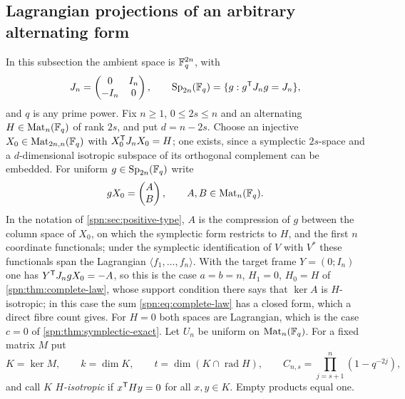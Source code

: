 
\subsection{Lagrangian projections of an arbitrary alternating form}\label{spn:sec:lagrangian}

In this subsection the ambient space is $\mathbb{F}_q^{2n}$, with
\[
 J_n=\begin{pmatrix}0&I_n\\-I_n&0\end{pmatrix},\qquad
 \operatorname{Sp}_{2n}(\mathbb{F}_q)=\{g:g^{\mathsf{T}}J_ng=J_n\},
\]
and $q$ is any prime power. Fix $n\ge1$,
$0\le2s\le n$ and an alternating $H\in\operatorname{Mat}_n(\mathbb{F}_q)$ of rank $2s$, and put $d=n-2s$. Choose
an injective $X_0\in\operatorname{Mat}_{2n,n}(\mathbb{F}_q)$ with $X_0^{\mathsf{T}}J_nX_0=H$; one exists, since a
symplectic $2s$-space and a $d$-dimensional isotropic subspace of its orthogonal complement
can be embedded. For uniform $g\in\operatorname{Sp}_{2n}(\mathbb{F}_q)$ write
\begin{equation}\label{spn:eq:lagrangian-model}
 gX_0=\begin{pmatrix}A\\B\end{pmatrix},\qquad A,B\in\operatorname{Mat}_n(\mathbb{F}_q).
\end{equation}
In the notation of \cref{spn:sec:positive-type}, $A$ is the compression of $g$ between the
column space of $X_0$, on which the symplectic form restricts to $H$, and the first $n$
coordinate functionals; under the symplectic identification of $V$ with $V^*$ these functionals
span the Lagrangian $\langle f_1,\dots,f_n\rangle$. With the target frame $Y=(0;I_n)$ one has
$Y^{\mathsf{T}}J_ngX_0=-A$, so this is the case $a=b=n$, $H_1=0$, $H_0=H$ of
\cref{spn:thm:complete-law}, whose support condition there says that $\ker A$ is
$H$-isotropic; in this case the sum \eqref{spn:eq:complete-law} has a closed form, which a
direct fibre count gives. For $H=0$ both spaces are Lagrangian, which is the case $c=0$ of
\cref{spn:thm:symplectic-exact}. Let $U_n$ be uniform on
$\operatorname{Mat}_n(\mathbb{F}_q)$. For a fixed matrix $M$ put
\[
 K=\ker M,\qquad k=\dim K,\qquad t=\dim(K\cap\operatorname{rad}H),\qquad
 C_{n,s}=\prod_{j=s+1}^n(1-q^{-2j}),
\]
and call $K$ \emph{$H$-isotropic} if $x^{\mathsf{T}}Hy=0$ for all $x,y\in K$. Empty products equal
one.

